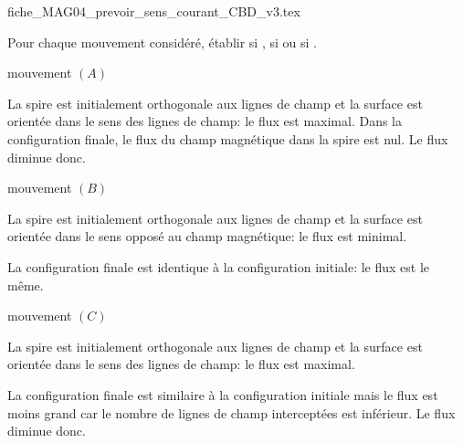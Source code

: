 \begin{center}
{fiche_MAG04_prevoir_sens_courant_CBD_v3.tex}
\end{center}

Pour chaque mouvement considéré, établir si , si  ou si .

\debutEntrainement


\begin{enonce}
mouvement $(A)$
\end{enonce}
\begin{corrige}
La spire est initialement orthogonale aux lignes de champ et la surface
est orientée dans le sens des lignes de champ: le flux est maximal. 
Dans la configuration finale, le flux du champ magnétique dans la
spire est nul.
Le flux diminue donc.
\end{corrige}




\begin{enonce}
mouvement $(B)$
\end{enonce}
\begin{corrige}
La spire est initialement orthogonale aux lignes de champ et la surface
est orientée dans le sens opposé au champ magnétique: le flux est
minimal. 

La configuration finale est identique à la configuration initiale:
le flux est le même. 
\end{corrige}




\begin{enonce}
mouvement $(C)$
\end{enonce}
\begin{corrige}
La spire est initialement orthogonale aux lignes de champ et la surface
est orientée dans le sens des lignes de champ: le flux est maximal. 

La configuration finale est similaire à la configuration initiale
mais le flux est moins grand car le nombre de lignes de champ interceptées
est inférieur.
Le flux diminue donc.
\end{corrige}

